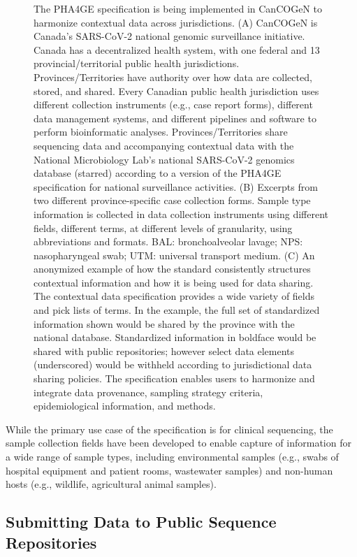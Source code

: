 \begin{figure}[]
\caption{The PHA4GE specification is being implemented in CanCOGeN to harmonize contextual data across jurisdictions. (A) CanCOGeN is Canada's SARS-CoV-2 national genomic surveillance initiative. Canada has a decentralized health system, with one federal and 13 provincial/territorial public health jurisdictions. Provinces/Territories have authority over how data are collected, stored, and shared. Every Canadian public health jurisdiction uses different collection instruments (e.g., case report forms), different data management systems, and different pipelines and software to perform bioinformatic analyses. Provinces/Territories share sequencing data and accompanying contextual data with the National Microbiology Lab's national SARS-CoV-2 genomics database (starred) according to a version of the PHA4GE specification for national surveillance activities. (B) Excerpts from two different province-specific case collection forms. Sample type information is collected in data collection instruments using different fields, different terms, at different levels of granularity, using abbreviations and formats. BAL: bronchoalveolar lavage; NPS: nasopharyngeal swab; UTM: universal transport medium. (C) An anonymized example of how the standard consistently structures contextual information and how it is being used for data sharing. The contextual data specification provides a wide variety of fields and pick lists of terms. In the example, the full set of standardized information shown would be shared by the province with the national database. Standardized information in boldface would be shared with public repositories; however select data elements (underscored) would be withheld according to jurisdictional data sharing policies. The specification enables users to harmonize and integrate data provenance, sampling strategy criteria, epidemiological information, and methods.}
\label{fig:chap7_figure_2}
\end{figure}

While the primary use case of the specification is for clinical sequencing, the sample collection fields have been developed to enable capture of information for a wide range of sample types, including environmental samples (e.g., swabs of hospital equipment and patient rooms, wastewater samples) and non-human hosts (e.g., wildlife, agricultural animal samples).

\subsection{Submitting Data to Public Sequence Repositories }

